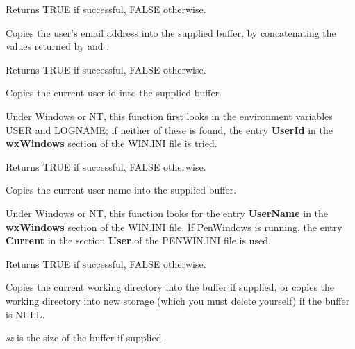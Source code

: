 Returns TRUE if successful, FALSE otherwise.

\label{wxgetemailaddress}


Copies the user's email address into the supplied buffer, by
concatenating the values returned by \rtfsp
and .

Returns TRUE if successful, FALSE otherwise.

\label{wxgetuserid}


Copies the current user id into the supplied buffer.

Under Windows or NT, this function first looks in the environment
variables USER and LOGNAME; if neither of these is found, the entry {\bf UserId}\rtfsp
in the {\bf wxWindows} section of the WIN.INI file is tried.

Returns TRUE if successful, FALSE otherwise.

\label{wxgetusername}


Copies the current user name into the supplied buffer.

Under Windows or NT, this function looks for the entry {\bf UserName}\rtfsp
in the {\bf wxWindows} section of the WIN.INI file. If PenWindows
is running, the entry {\bf Current} in the section {\bf User} of
the PENWIN.INI file is used.

Returns TRUE if successful, FALSE otherwise.



Copies the current working directory into the buffer if supplied, or
copies the working directory into new storage (which you must delete yourself)
if the buffer is NULL.

{\it sz} is the size of the buffer if supplied.



